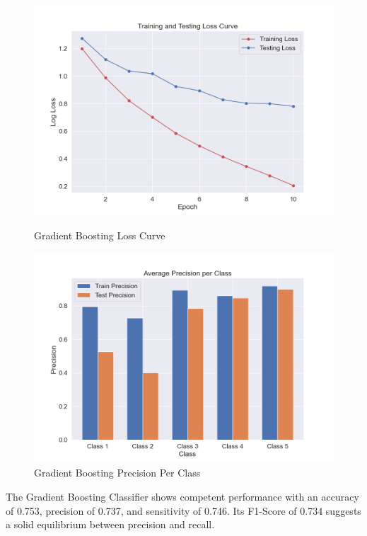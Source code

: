 \begin{figure}[H]
	\vspace{1em}
	
	\begin{minipage}[t]{0.48\textwidth}
		\centering
		\includegraphics[width=\textwidth]{img/paper_1/loss_curve.png}
		\caption{Gradient Boosting Loss Curve}
	\end{minipage}
	\hfill
	\begin{minipage}[t]{0.48\textwidth}
		\centering
		\includegraphics[width=\textwidth]{img/paper_1/precision_per_class.png}
		\caption{Gradient Boosting Precision Per Class}
	\end{minipage}
\end{figure}


The Gradient Boosting Classifier shows competent performance with an accuracy of 0.753, precision of 0.737, and sensitivity of 0.746. Its F1-Score of 0.734 suggests a solid equilibrium between precision and recall.


